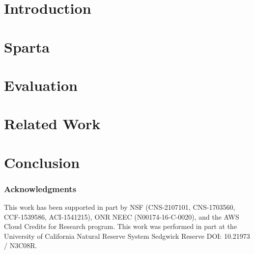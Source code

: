 \documentclass[runningheads]{llncs}
\begin{document}
\section{Introduction}
\label{sec:intro}


\section{Sparta}
\label{sec:Sparta}


\section{Evaluation}
\label{sec:eval}


\section{Related Work}
\label{sec:relate_work}


\section{Conclusion}
\label{sec:conclusion}


\subsubsection{Acknowledgments}
This work has been supported in part by NSF (CNS-2107101, CNS-1703560, CCF-1539586, ACI-1541215), ONR NEEC (N00174-16-C-0020), and the AWS Cloud Credits for Research program. This work was performed in part at the University of California Natural Reserve System Sedgwick Reserve DOI: 10.21973 / N3C08R.

%
%
%


% 
\end{document}
